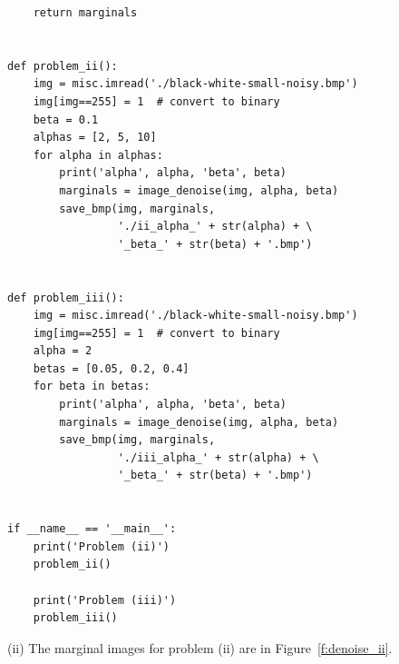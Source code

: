 \documentclass{article}
\begin{document}
\begin{lstlisting}
    return marginals


def problem_ii():
    img = misc.imread('./black-white-small-noisy.bmp')
    img[img==255] = 1  # convert to binary
    beta = 0.1
    alphas = [2, 5, 10]
    for alpha in alphas:
        print('alpha', alpha, 'beta', beta)
        marginals = image_denoise(img, alpha, beta)
        save_bmp(img, marginals,
                 './ii_alpha_' + str(alpha) + \
                 '_beta_' + str(beta) + '.bmp')


def problem_iii():
    img = misc.imread('./black-white-small-noisy.bmp')
    img[img==255] = 1  # convert to binary
    alpha = 2
    betas = [0.05, 0.2, 0.4]
    for beta in betas:
        print('alpha', alpha, 'beta', beta)
        marginals = image_denoise(img, alpha, beta)
        save_bmp(img, marginals,
                 './iii_alpha_' + str(alpha) + \
                 '_beta_' + str(beta) + '.bmp')


if __name__ == '__main__':
    print('Problem (ii)')
    problem_ii()

    print('Problem (iii)')
    problem_iii()

\end{lstlisting}
(ii)
The marginal images for problem (ii) are in Figure~\ref{f:denoise_ii}.
\end{document}
